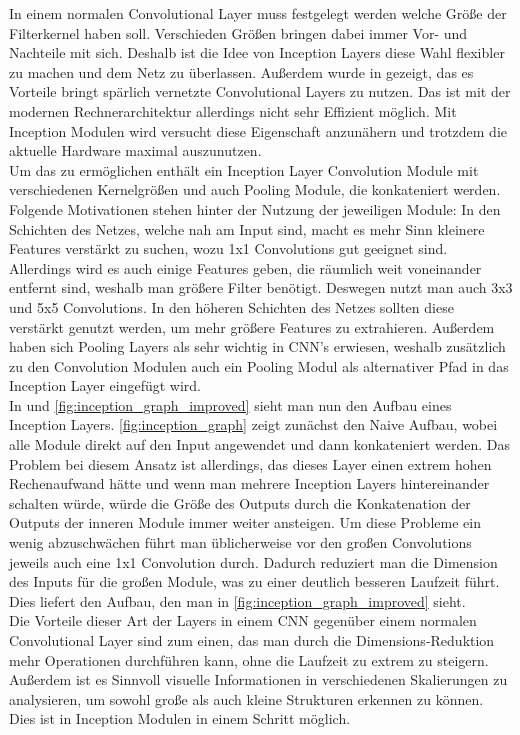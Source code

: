 \documentclass[runningheads,a4paper]{llncs}[2015/06/24]
\begin{document}
In einem normalen Convolutional Layer muss festgelegt werden welche Größe der Filterkernel haben soll. Verschieden Größen bringen dabei immer Vor- und Nachteile mit sich. Deshalb ist die Idee von Inception Layers diese Wahl flexibler zu machen und dem Netz zu überlassen. Außerdem wurde in \cite{sparse_paper} gezeigt, das es Vorteile bringt spärlich vernetzte Convolutional Layers zu nutzen. Das ist mit der modernen Rechnerarchitektur allerdings nicht sehr Effizient möglich. Mit Inception Modulen wird versucht diese Eigenschaft anzunähern und trotzdem die aktuelle Hardware maximal auszunutzen.\\
Um das zu ermöglichen enthält ein Inception Layer Convolution Module mit verschiedenen Kernelgrößen und auch Pooling Module, die konkateniert werden. Folgende Motivationen stehen hinter der Nutzung der jeweiligen Module: In den Schichten des Netzes, welche nah am Input sind, macht es mehr Sinn kleinere Features verstärkt zu suchen, wozu 1x1 Convolutions gut geeignet sind. Allerdings wird es auch einige Features geben, die räumlich weit voneinander entfernt sind, weshalb man größere Filter benötigt. Deswegen nutzt man auch 3x3 und 5x5 Convolutions. In den höheren Schichten des Netzes sollten diese verstärkt genutzt werden, um mehr größere Features zu extrahieren. Außerdem haben sich Pooling Layers als sehr wichtig in CNN's erwiesen, weshalb zusätzlich zu den Convolution Modulen auch ein Pooling Modul als alternativer Pfad in das Inception Layer eingefügt wird.\\
In  und \cref{fig:inception_graph_improved} sieht man nun den Aufbau eines Inception Layers. \cref{fig:inception_graph} zeigt zunächst den Naive Aufbau, wobei alle Module direkt auf den Input angewendet und dann konkateniert werden. Das Problem bei diesem Ansatz ist allerdings, das dieses Layer einen extrem hohen Rechenaufwand hätte und wenn man mehrere Inception Layers hintereinander schalten würde, würde die Größe des Outputs durch die Konkatenation der Outputs der inneren Module immer weiter ansteigen.
Um diese Probleme ein wenig abzuschwächen führt man üblicherweise vor den großen Convolutions jeweils auch eine 1x1 Convolution durch. Dadurch reduziert man die Dimension des Inputs für die großen Module, was zu einer deutlich besseren Laufzeit führt. Dies liefert den Aufbau, den man in \cref{fig:inception_graph_improved} sieht.\\
Die Vorteile dieser Art der Layers in einem CNN gegenüber einem normalen Convolutional Layer sind zum einen, das man durch die Dimensions-Reduktion mehr Operationen durchführen kann, ohne die Laufzeit zu extrem zu steigern. Außerdem ist es Sinnvoll visuelle Informationen in verschiedenen Skalierungen zu analysieren, um sowohl große als auch kleine Strukturen erkennen zu können. Dies ist in Inception Modulen in einem Schritt möglich.\\
\end{document}
